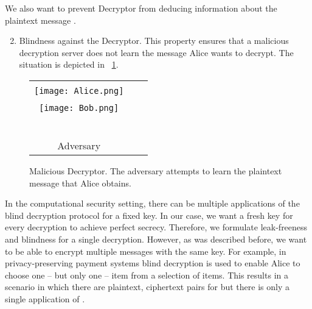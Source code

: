 \documentclass[10pt,journal]{IEEEtran}
\begin{document}
We also want to prevent Decryptor from deducing information about the plaintext message .
\begin{enumerate}
\setcounter{enumi}{1}
	\item Blindness against the Decryptor. This property ensures that a malicious decryption server does not learn the message Alice wants to decrypt. The situation
is depicted in \figurename~\ref{fig:malicious_server}.
\end{enumerate}
\begin{figure}[!t]
\centering
\begin{tabular}{ccc}
\ovalbox{\begin{minipage}{0.3\columnwidth}
\centering
Alice\\
\vspace{0.1cm}
\texttt{[image: Alice.png]}\\

\end{minipage}
}
&  & 
\ovalbox{\begin{minipage}{0.3\columnwidth}
\centering
Encryptor\\
\vspace{0.1cm}
\texttt{[image: Bob.png]}\\

\end{minipage}
}\\
 & & \\
 & & \\
 & & \\
\color{red}
\Ovalbox{\begin{minipage}{0.3\columnwidth}
\centering
\\
\\
Adversary
\end{minipage}
}
\end{tabular}
\caption{Malicious Decryptor. The adversary attempts to learn the plaintext message that Alice obtains.}
\label{fig:malicious_server}
\end{figure}
In the computational security setting, there can be multiple applications of the blind decryption
protocol for a fixed key.
In our case, we want a fresh key for every decryption to achieve perfect secrecy.
Therefore, we formulate leak-freeness and blindness for a single decryption.
However, as was described before, we want to be able to encrypt multiple messages with the same key.
For example, in privacy-preserving payment
systems blind decryption is used to enable Alice to choose one -- but only one -- item from a selection of items.
This results in
a scenario in which there are  plaintext, ciphertext pairs  for 
but there is only a single application of .
\end{document}

